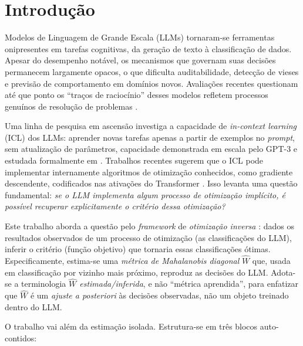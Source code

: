 \documentclass[12pt,a4paper]{article}
\newcommand{\West}{\ensuremath{\hat{W}}}   %
\begin{document}
\tableofcontents
\newpage

\section{Introdução}
\label{sec:intro}

Modelos de Linguagem de Grande Escala (LLMs) tornaram-se ferramentas onipresentes em
tarefas cognitivas, da geração de texto à classificação de dados. Apesar do desempenho
notável, os mecanismos que governam suas decisões permanecem largamente opacos, o que
dificulta auditabilidade, detecção de vieses e previsão de comportamento em domínios
novos. Avaliações recentes questionam até que ponto os ``traços de raciocínio''
desses modelos refletem processos genuínos de resolução de problemas
\cite{shojaeeIllusionThinking2025}.

Uma linha de pesquisa em ascensão investiga a capacidade de \emph{in-context learning}
(ICL) dos LLMs: aprender novas tarefas apenas a partir de exemplos no \emph{prompt}, sem
atualização de parâmetros, capacidade demonstrada em escala pelo GPT-3
\cite{brownLanguageModels2020} e estudada formalmente em
\cite{gargWhatTransformers2022, akyurekWhatLearning2023}.
Trabalhos recentes sugerem que o ICL pode implementar internamente algoritmos de
otimização conhecidos, como gradiente descendente, codificados nas ativações do
Transformer \cite{akyurekWhatLearning2023}. Isso levanta uma questão fundamental:
\emph{se o LLM implementa algum processo de otimização implícito, é possível recuperar
explicitamente o critério dessa otimização?}

Este trabalho aborda a questão pelo \emph{framework} de \emph{otimização inversa}
\cite{chanInverseOptimization2025}: dados os resultados observados de um processo de
otimização (as classificações do LLM), inferir o critério (função objetivo) que tornaria
essas classificações ótimas. Especificamente, estima-se uma \emph{métrica de Mahalanobis
diagonal} \West{} que, usada em classificação por vizinho mais próximo, reproduz as
decisões do LLM. Adota-se a terminologia \emph{\West{} estimada/inferida}, e não
``métrica aprendida'', para enfatizar que \West{} é um \emph{ajuste \textit{a posteriori}}
às decisões observadas, não um objeto treinado dentro do LLM.

O trabalho vai além da estimação isolada. Estrutura-se em três blocos auto-contidos:
\end{document}
